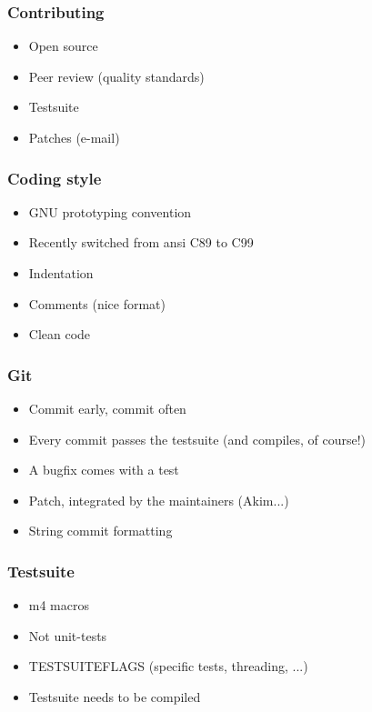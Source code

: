 \begin{frame}
  \frametitle{Contributing}
    \begin{itemize}[<+->]
      \item Open source
      \item Peer review (quality standards)
      \item Testsuite
      \item Patches (e-mail)
    \end{itemize}
\end{frame}

\begin{frame}
  \frametitle{Coding style}
    \begin{itemize}[<+->]
      \item GNU prototyping convention
      \item Recently switched from ansi C89 to C99
      \item Indentation
      \item Comments (nice format)
      \item Clean code
    \end{itemize}
\end{frame}

\begin{frame}
  \frametitle{Git}
    \begin{itemize}[<+->]
      \item Commit early, commit often
      \item Every commit passes the testsuite (and compiles, of course!)
      \item A bugfix comes with a test
      \item Patch, integrated by the maintainers (Akim...)
      \item String commit formatting
    \end{itemize}
\end{frame}

\begin{frame}
  \frametitle{Testsuite}
    \begin{itemize}[<+->]
      \item m4 macros
      \item Not unit-tests
      \item TESTSUITEFLAGS (specific tests, threading, ...)
      \item Testsuite needs to be compiled
    \end{itemize}
\end{frame}
